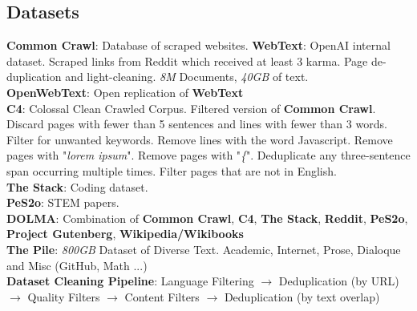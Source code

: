 \begin{multicols}{2}
\begin{mdframed}[style=eqbox]
        \subsection{Datasets}
        \textbf{Common Crawl}: Database of scraped websites.
        \textbf{WebText}: OpenAI internal dataset. Scraped links from Reddit which received at least 3 karma. Page de-duplication and light-cleaning. \textit{8M} Documents, \textit{40GB} of text.\\
        \textbf{OpenWebText}: Open replication of \textbf{WebText}\\
        \textbf{C4}: Colossal Clean Crawled Corpus. Filtered version of \textbf{Common Crawl}. Discard pages with fewer than 5 sentences and lines with fewer than 3 words. Filter for unwanted keywords. Remove lines with the word Javascript. Remove pages with "\textit{lorem ipsum}". Remove pages with "\textit{\{}". Deduplicate any three-sentence span occurring multiple times. Filter pages that are not in English.\\
        \textbf{The Stack}: Coding dataset.\\
        \textbf{PeS2o}: STEM papers.\\
        \textbf{DOLMA}: Combination of \textbf{Common Crawl}, \textbf{C4}, \textbf{The Stack}, \textbf{Reddit}, \textbf{PeS2o}, \textbf{Project Gutenberg}, \textbf{Wikipedia/Wikibooks}\\
        \textbf{The Pile}: \textit{800GB} Dataset of Diverse Text. Academic, Internet, Prose, Dialoque and Misc (GitHub, Math ...)\\[1em]
        \textbf{Dataset Cleaning Pipeline}: Language Filtering $\to$ Deduplication (by URL) $\to$ Quality Filters $\to$ Content Filters $\to$ Deduplication (by text overlap)
    \end{mdframed}

    \begin{mdframed}[style=eqbox]

\end{mdframed}
\end{multicols}
